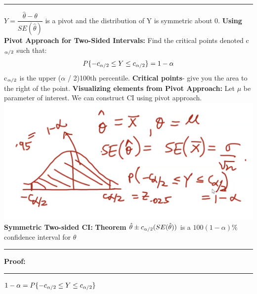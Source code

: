 \documentclass[]{article}
\begin{document}
\newline\Large\rule{3.0cm}{0pt}$Y = \dfrac{\hat{\theta} - \theta}{ SE(\hat{\theta})}$ is a pivot and the distribution of Y is symmetric about 0.
\newline
\newline
\newline\Large\textbf{ Using Pivot Approach for Two-Sided Intervals:}
\newline Find the critical points denoted c$_{\alpha \\/ 2}$ such that:
\[  P \{ -c_{\alpha \\/ 2} \le Y \le c_{\alpha \\/ 2}  \}   = 1 - \alpha  \] 
c$_{\alpha \\/ 2}$ is the upper ($\alpha$ / 2)100th percentile.
\newline
\newline \textbf{Critical points}- give you the area to the right of the point. \newline
\newline\textbf{Visualizing elements from Pivot Approach:}
\newline Let $\mu$ be parameter of interest. We can construct CI using pivot approach.
\newline
\includegraphics[scale=0.6]{general_ci_example}
\newline
\newline
\newline 
\newline
\Large\textbf{Symmetric Two-sided CI:}
\Large\textbf{Theorem}
\newline $ \hat\theta \pm c_{\alpha \\/ 2}(SE(\hat\theta))$ is a $100(1-\alpha)\%$ confidence interval for $\theta$
\newline 
\newline\Large\rule{3.0cm}{0pt} \textbf{Proof:}
\newline\Large\rule{3.0cm}{0pt}  $ 1 - \alpha =  P \{ -c_{\alpha \\/ 2} \le Y \le c_{\alpha \\/ 2}  \}$
\end{document}
